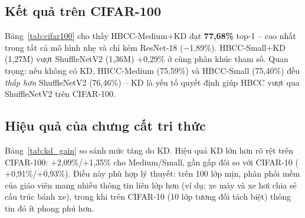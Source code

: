 \documentclass[journal]{IEEEtran}
\begin{document}
\subsection{Kết quả trên CIFAR-100}

Bảng~\ref{tab:cifar100} cho thấy HBCC-Medium+KD đạt \textbf{77,68\%}
top-1 -- cao nhất trong tất cả mô hình nhẹ và chỉ kém ResNet-18
($-$1,89\%). HBCC-Small+KD (1,27M) vượt ShuffleNetV2 (1,36M)
$+$0,29\% ở cùng phân khúc tham số. Quan trọng: nếu không có KD,
HBCC-Medium (75,59\%) và HBCC-Small (75,40\%) đều \emph{thấp hơn}
ShuffleNetV2 (76,46\%) -- KD là yếu tố quyết định giúp HBCC vượt
qua ShuffleNetV2 trên CIFAR-100.

\begin{table}[!t]
  \caption{So sánh trên CIFAR-100. \textbf{In đậm}: tốt nhất trong
           nhóm nhẹ. \texttt{+KD}: huấn luyện với chưng cất tri thức.}
  \label{tab:cifar100}
  \centering
  \renewcommand{\arraystretch}{1.15}
\end{table}

\subsection{Hiệu quả của chưng cất tri thức}

Bảng~\ref{tab:kd_gain} so sánh mức tăng do KD. Hiệu quả KD lớn hơn
rõ rệt trên CIFAR-100: $+$2,09\%/$+$1,35\% cho Medium/Small, gần
gấp đôi so với CIFAR-10 ($+$0,91\%/$+$0,93\%). Điều này phù hợp
lý thuyết: trên 100 lớp mịn, phân phối mềm của giáo viên mang nhiều
thông tin liên lớp hơn (ví dụ: xe máy và xe hơi chia sẻ cấu trúc
bánh xe), trong khi trên CIFAR-10 (10 lớp tương đối tách biệt)
thông tin đó ít phong phú hơn.
\end{document}

